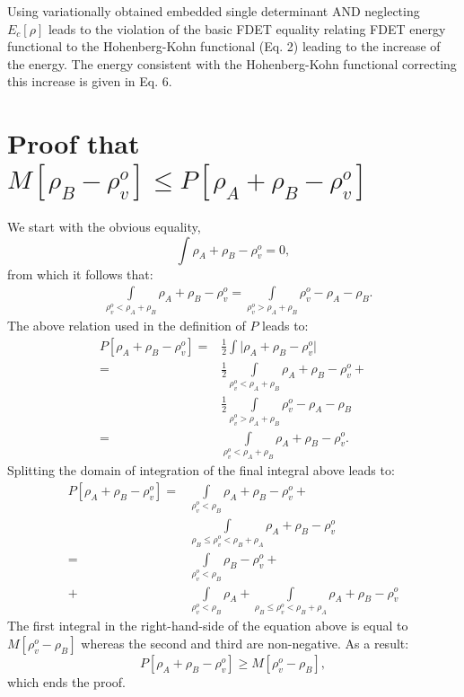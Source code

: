 \documentclass[amsmath,amssymb,preprint,aip,jcp]{revtex4-1}
\begin{document}
{Using variationally obtained embedded single determinant AND neglecting $E_c[\rho]$ leads to the violation of the basic FDET equality relating FDET energy functional to the Hohenberg-Kohn functional (Eq. 2) leading to the increase of the energy. The energy consistent with the Hohenberg-Kohn functional correcting this increase is given in Eq. 6.
}
\section{Proof that $M[\rho_{B} - \rho_{v}^{o}] \leq P[\rho_A+\rho_B - \rho_{v}^{o}] $}
We start with the obvious equality,
\begin{equation}
\int \rho_A + \rho_B - \rho_{v}^o = 0, 
\end{equation}
from which it follows that:
\begin{align}
 & \int\limits_{\rho_{v}^o < \rho_A + \rho_B}\rho_A + \rho_B - \rho_{v}^o = \int\limits_{\rho_{v}^o > \rho_A + \rho_B}\rho_{v}^o - \rho_A - \rho_B.
\end{align}
The above relation used in the definition of $P$ leads to:
\begin{align}\label{eq:P_alternatives}
P[\rho_A + \rho_B - \rho_{v}^o] = & \frac{1}{2}  \int \vert \rho_A + \rho_B - \rho_{v}^o \vert \\ \nonumber
 = & \frac{1}{2}  \int\limits_{\rho_{v}^o <\rho_A + \rho_B}\rho_A + \rho_B - \rho_{v}^o + \\ \nonumber
 & \frac{1}{2}  \int\limits_{\rho_{v}^o > \rho_A + \rho_B} \rho_{v}^o - \rho_A - \rho_B \\ \nonumber
= & \int\limits_{\rho_{v}^o <\rho_A + \rho_B}\rho_A + \rho_B - \rho_{v}^o.
\end{align}
Splitting the domain of integration of the final integral above  leads to: 
\begin{align}
P[\rho_A + \rho_B - \rho_{v}^o] = & \int\limits_{\rho_{v}^o < \rho_B}\rho_A + \rho_B - \rho_{v}^o + \\ \nonumber
 & \int\limits_{\rho_B \leq \rho_{v}^o < \rho_B + \rho_A}\rho_A + \rho_B - \rho_{v}^o\nonumber \\
 = & \int\limits_{\rho_{v}^o < \rho_B} \rho_B - \rho_{v}^o + \\ \nonumber
 +&\int\limits_{\rho_{v}^o < \rho_B}\rho_A + \int\limits_{\rho_B \leq \rho_{v}^o < \rho_B + \rho_A}\rho_A + \rho_B - \rho_{v}^o\nonumber 
\end{align}
The first integral in the right-hand-side of the equation above is equal to $M[\rho_{v}^o - \rho_B]$ whereas the second and third are non-negative. As a result:
\begin{equation}
 P[\rho_A + \rho_B - \rho_{v}^o] \geq M[\rho_{v}^o - \rho_B],
\end{equation}
which ends the proof.
\end{document}

